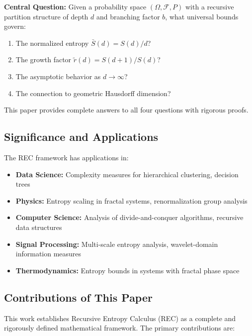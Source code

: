 \documentclass[11pt,a4paper]{article}
\theoremstyle{definition}
\theoremstyle{remark}
\newcommand{\Sbar}{\bar{S}}
\newcommand{\rtilde}{\tilde{r}}
\newcommand{\Field}{\mathcal{F}}
\begin{document}
\begin{mdframed}[backgroundcolor=gray!10]
\textbf{Central Question:} Given a probability space $(\Omega, \Field, P)$ with a recursive partition structure of depth $d$ and branching factor $b$, what universal bounds govern:
\begin{enumerate}[nosep]
    \item[(i)] The normalized entropy $\Sbar(d) = S(d)/d$?
    \item[(ii)] The growth factor $\rtilde(d) = S(d+1)/S(d)$?
    \item[(iii)] The asymptotic behavior as $d \to \infty$?
    \item[(iv)] The connection to geometric Hausdorff dimension?
\end{enumerate}
\end{mdframed}

This paper provides complete answers to all four questions with rigorous proofs.

\subsection{Significance and Applications}

The REC framework has applications in:

\begin{itemize}
    \item \textbf{Data Science:} Complexity measures for hierarchical clustering, decision trees
    \item \textbf{Physics:} Entropy scaling in fractal systems, renormalization group analysis
    \item \textbf{Computer Science:} Analysis of divide-and-conquer algorithms, recursive data structures
    \item \textbf{Signal Processing:} Multi-scale entropy analysis, wavelet-domain information measures
    \item \textbf{Thermodynamics:} Entropy bounds in systems with fractal phase space
\end{itemize}

\subsection{Contributions of This Paper}
\label{subsec:contributions}

This work establishes Recursive Entropy Calculus (REC) as a complete and 
rigorously defined mathematical framework. The primary contributions are:
\end{document}
